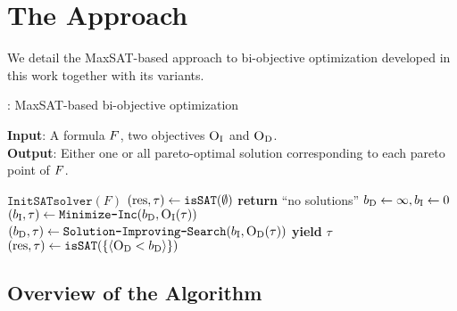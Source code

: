 \chapter{The Approach\label{chap:approach}}

We detail the MaxSAT-based approach to bi-objective optimization developed in this work together with its variants.

\begin{algorithm}[t]
  \caption{\algname: MaxSAT-based  bi-objective optimization} %
  \label{alg:base-algorithm}
  \textbf{Input}: A formula $F$, two objectives $\textsc{O}_{\text{I}}$ and $\textsc{O}_{\text{D}}$.\\
  \textbf{Output}: Either one or all pareto-optimal solution corresponding to each pareto point of $F$.

  \begin{algorithmic}[1]
    \STATE $\texttt{InitSATsolver}(F)$ \label{l:init-solv} 
    \STATE $(\text{res}, \tau) \gets \texttt{isSAT}(\emptyset)$ \quad{}  \label{l:sols} 
      \STATE \textbf{return} ``no solutions''
    \ENDIF
    \STATE $b_{\text{D}} \gets \infty, b_{\text{I}} \gets 0$ \label{l:bounds}
     \label{l:loopstart}
    \STATE $(b_{\text{I}}, \tau) \gets \texttt{Minimize-\allowbreak{}Inc}(b_{\text{D}} , \textsc{O}_{\text{I}}(\tau))$  \quad{}\label{l:minim1}
    \STATE $(b_{\text{D}}, \tau) \gets  \texttt{Solution-\allowbreak{}Improving-\allowbreak{}Search}(b_{\text{I}} , \textsc{O}_{\text{D}}(\tau))$  \quad{}\label{l:minim2}
    \STATE \textbf{yield} $\tau$  \quad{} \label{ln:stage3} 
    \STATE $(\text{res}, \tau) \gets \texttt{isSAT}(\{\langle \textsc{O}_{\text{D}} < b_{\text{D}} \rangle\})$\label{l:endL}
    \ENDWHILE  \label{l:loopend}
  \end{algorithmic}
\end{algorithm}

\section{Overview of the Algorithm\label{sec:algorithm}}

